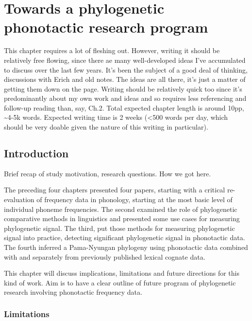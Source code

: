 \chapter[Towards phylogenetic phonotactics]{Towards a phylogenetic phonotactic research program}
\label{Chap:Discussion}

This chapter requires a lot of fleshing out. However, writing it should be relatively free flowing, since there ae many well-developed ideas I've accumulated to discuss over the last few years. It's been the subject of a good deal of thinking, discussions with Erich and old notes. The ideas are all there, it's just a matter of getting them down on the page. Writing should be relatively quick too since it's predominantly about my own work and ideas and so requires less referencing and follow-up reading than, say, Ch.2. Total expected chapter length is around 10pp, \textasciitilde{}4-5k words. Expected writing time is 2 weeks (\textless{}500 words per day, which should be very doable given the nature of this writing in particular).

\hypertarget{discussion-intro}{%
\section{Introduction}\label{discussion-intro}}

Brief recap of study motivation, research questions. How we got here.

The preceding four chapters presented four papers, starting with a critical re-evaluation of frequency data in phonology, starting at the most basic level of individual phoneme frequencies. The second examined the role of phylogenetic comparative methods in linguistics and presented some use cases for measuring phylogenetic signal. The third, put those methods for measuring phylogenetic signal into practice, detecting significant phylogenetic signal in phonotactic data. The fourth inferred a Pama-Nyungan phylogeny using phonotactic data combined with and separately from previously published lexical cognate data.

This chapter will discuss implications, limitations and future directions for this kind of work. Aim is to have a clear outline of future program of phylogenetic research involving phonotactic frequency data.

\hypertarget{limitations}{%
\subsection{Limitations}\label{limitations}}


